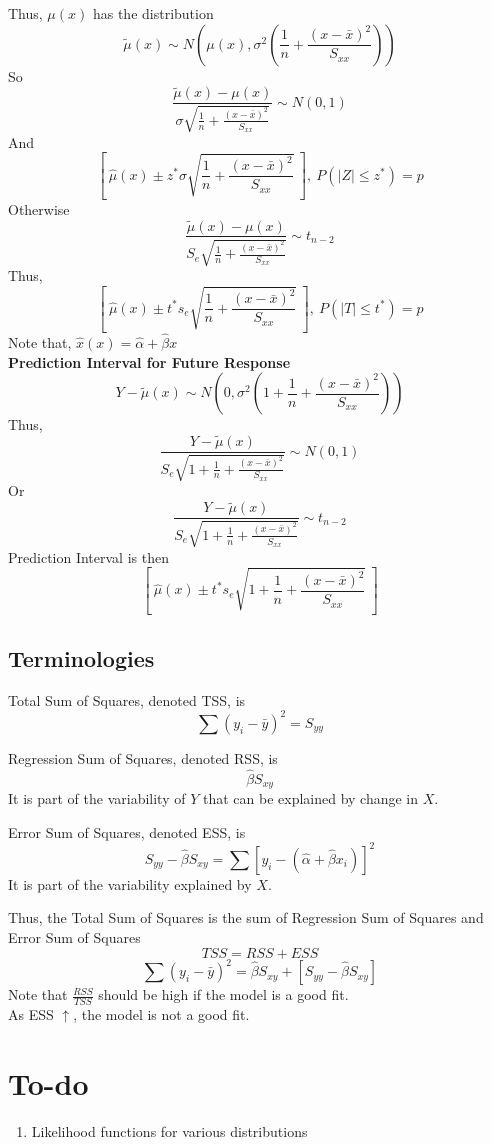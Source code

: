 \documentclass[12pt, leqno]{article}
\theoremstyle{definition}
\begin{document}
  Thus, $\mu(x)$ has the distribution
  $$\widetilde{\mu}(x) \sim N\left(\mu(x), \sigma^{2}\left(\frac{1}{n} + \frac{(x - \bar{x})^{2}}{S_{xx}}\right)\right)$$
  So
  $$\frac{\widetilde{\mu}(x) - \mu(x)}{\sigma\sqrt{\frac{1}{n} + \frac{(x - \bar{x})^{2}}{S_{xx}}}} \sim N(0, 1)$$
  And
  $$\left[~\hat{\mu}(x) \pm z^{*}\sigma\sqrt{\frac{1}{n} + \frac{(x - \bar{x})^{2}}{S_{xx}}}~\right], ~P(|Z| \leq z^{*}) = p$$
  \newline
  Otherwise
  $$\frac{\widetilde{\mu}(x) - \mu(x)}{S_{e}\sqrt{\frac{1}{n} + \frac{(x - \bar{x})^{2}}{S_{xx}}}} \sim t_{n-2}$$
  Thus,
  $$\left[~\hat{\mu}(x) \pm t^{*}s_{e}\sqrt{\frac{1}{n} + \frac{(x - \bar{x})^{2}}{S_{xx}}}~\right], ~P(|T| \leq t^{*}) = p$$
  \newline
  Note that, $\hat{x}(x) = \hat{\alpha} + \hat{\beta}x$ \\
  \newline
  \textbf{Prediction Interval for Future Response} \\
  $$Y - \widetilde{\mu}(x) \sim N\left(0, \sigma^{2}\left(1 + \frac{1}{n} + \frac{(x - \bar{x})^{2}}{S_{xx}}\right)\right)$$
  Thus,
  $$\frac{Y - \widetilde{\mu}(x)}{S_{e}\sqrt{1 + \frac{1}{n} + \frac{(x - \bar{x})^{2}}{S_{xx}}}} \sim N(0, 1)$$
  Or
  $$\frac{Y - \widetilde{\mu}(x)}{S_{e}\sqrt{1 + \frac{1}{n} + \frac{(x - \bar{x})^{2}}{S_{xx}}}} \sim t_{n-2}$$
  \newline
  Prediction Interval is then
  $$\left[~\hat{\mu}(x) \pm t^{*}s_{e}\sqrt{1 + \frac{1}{n} + \frac{(x - \bar{x})^{2}}{S_{xx}}} ~\right]$$

  \subsection{Terminologies}
  Total Sum of Squares, denoted TSS, is
  $$\sum (y_{i} - \bar{y})^{2} = S_{yy}$$

  Regression Sum of Squares, denoted RSS, is
  $$\hat{\beta}S_{xy}$$
  It is part of the variability of $Y$ that can be explained by change in $X$.

  Error Sum of Squares, denoted ESS, is
  $$S_{yy} - \hat{\beta}S_{xy} = \sum [y_{i} - (\hat{\alpha} + \hat{\beta}x_{i})]^{2}$$
  It is part of the variability explained by $X$.

  Thus, the Total Sum of Squares is the sum of Regression Sum of Squares and Error Sum of Squares
  $$TSS = RSS + ESS$$
  $$\sum (y_{i} - \bar{y})^{2} = \hat{\beta}S_{xy} + [S_{yy} - \hat{\beta}S_{xy}]$$
  Note that $\frac{RSS}{TSS}$ should be high if the model is a good fit. \\
  As ESS $\uparrow$, the model is not a good fit.


  \newpage
  \section{To-do}
  \begin{enumerate}
    \item Likelihood functions for various distributions
  \end{enumerate}
\end{document}

